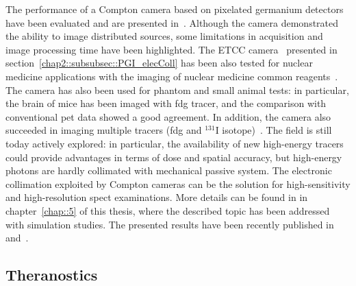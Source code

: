 The performance of a Compton camera based on pixelated germanium detectors have been evaluated and are presented in~\parencite{Alnaaimi2011}. Although the camera demonstrated the ability to image distributed sources, some limitations in acquisition and image processing time have been highlighted. 
The ETCC camera~\parencite{Kabuki2007} presented in section~\ref{chap2::subsubsec::PGI_elecColl} has been also tested for nuclear medicine applications with the imaging of nuclear medicine common reagents~\parencite{Kabuki2009}. The camera has also been used for phantom and small animal tests: in particular, the brain of mice has been imaged with \gls{fdg} tracer, and the comparison with conventional \gls{pet} data showed a good agreement. In addition, the camera also succeeded in imaging multiple tracers (\gls{fdg} and $^{131}$I isotope)~\parencite{Kabuki2010}.
The field is still today actively explored: in particular, the availability of new high-energy tracers could provide advantages in terms of dose and spatial accuracy, but high-energy photons are hardly collimated with mechanical passive system. The electronic collimation exploited by Compton cameras can be the solution for high-sensitivity and high-resolution \gls{spect} examinations. 
More details can be found in in chapter~\ref{chap::5} of this thesis, where the described topic has been addressed with simulation studies. The presented results have been recently published in~\parencite{Fontana2017_PMB} and~\parencite{Fontana2017_APPB}. 

\subsection{Theranostics}\label{chap2::subsec::Theranostics}

